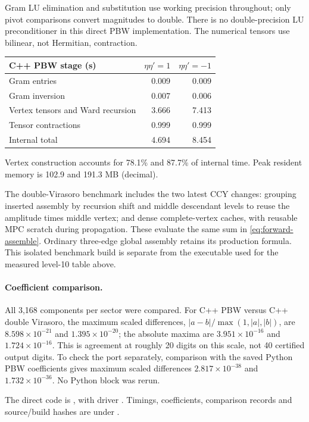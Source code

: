 Gram LU elimination and substitution use working precision throughout;
only pivot comparisons convert magnitudes to double. There is no
double-precision LU preconditioner in this direct PBW implementation.
The numerical tensors use bilinear, not Hermitian, contraction.
\begin{center}\small
\begin{tabular}{@{}lrr@{}}
\toprule
C++ PBW stage (s) & $\eta\eta'=1$ & $\eta\eta'=-1$\\
\midrule
Gram entries & 0.009 & 0.009\\
Gram inversion & 0.007 & 0.006\\
Vertex tensors and Ward recursion & 3.666 & 7.413\\
Tensor contractions & 0.999 & 0.999\\
Internal total & 4.694 & 8.454\\
\bottomrule
\end{tabular}
\end{center}
Vertex construction accounts for 78.1\% and 87.7\% of internal time. Peak resident memory is 102.9 and 191.3 MB (decimal).

The double-Virasoro benchmark includes the two latest CCY changes:
grouping inserted assembly by recursion shift and middle descendant
levels to reuse the amplitude times middle vertex; and dense complete-vertex
caches, with reusable MPC scratch during propagation. These evaluate
the same sum in \eqref{eq:forward-assemble}. Ordinary three-edge global
assembly retains its production formula. This isolated benchmark build
is separate from the executable used for the measured level-10 table above.

\paragraph{Coefficient comparison.}
All 3,168 components per sector were compared. For C++ PBW versus
C++ double Virasoro, the maximum scaled differences,
$|a-b|/\max(1,|a|,|b|)$, are $8.598\times10^{-21}$
and $1.395\times10^{-20}$; the absolute maxima are
$3.951\times10^{-16}$ and $1.724\times10^{-16}$.
This is agreement at roughly 20 digits on this scale, not 40 certified
output digits. To check the port separately, comparison with the saved
Python PBW coefficients gives maximum scaled differences $2.817\times10^{-38}$
and $1.732\times10^{-36}$. No Python block was rerun.

\begingroup\raggedright
The direct code is , with driver
. Timings, coefficients, comparison records
and source/build hashes are under
.
\par\endgroup
